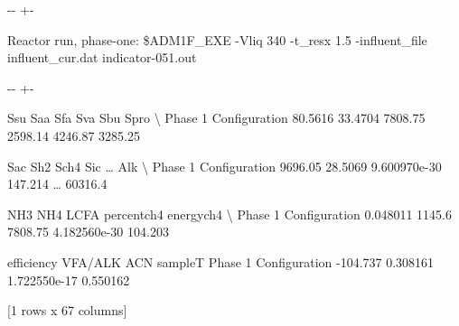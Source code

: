 \documentclass[a4paper,10pt,english]{sphinxmanual}
\newlength\nbsphinxcodecellspacing
\begin{document}
{

\kern-\sphinxverbatimsmallskipamount\kern-\baselineskip
\kern+\FrameHeightAdjust\kern-\fboxrule
\vspace{\nbsphinxcodecellspacing}

\begin{sphinxVerbatim}[commandchars=\\\{\}]
Reactor run, phase-one:
\$ADM1F\_EXE  -Vliq 340 -t\_resx 1.5 -influent\_file influent\_cur.dat
indicator-051.out
\end{sphinxVerbatim}
}

{

\kern-\sphinxverbatimsmallskipamount\kern-\baselineskip
\kern+\FrameHeightAdjust\kern-\fboxrule
\vspace{\nbsphinxcodecellspacing}

\begin{sphinxVerbatim}[commandchars=\\\{\}]
\llap{\color{nbsphinxout}[11]:\,\hspace{\fboxrule}\hspace{\fboxsep}}                          Ssu      Saa      Sfa      Sva      Sbu     Spro   \textbackslash{}
Phase 1 Configuration  80.5616  33.4704  7808.75  2598.14  4246.87  3285.25

                          Sac      Sh2          Sch4      Sic   {\ldots}     Alk   \textbackslash{}
Phase 1 Configuration  9696.05  28.5069  9.600970e-30  147.214  {\ldots}  60316.4

                           NH3     NH4     LCFA    percentch4    energych4   \textbackslash{}
Phase 1 Configuration  0.048011  1145.6  7808.75  4.182560e-30      104.203

                       efficiency   VFA/ALK           ACN   sampleT
Phase 1 Configuration    -104.737  0.308161  1.722550e-17  0.550162

[1 rows x 67 columns]
\end{sphinxVerbatim}
}
\end{document}
